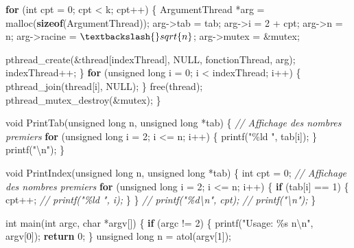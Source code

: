 \documentclass[
]{article}
\newenvironment{Shaded}{}{}
\newcommand{\CommentTok}[1]{\textcolor[rgb]{0.38,0.63,0.69}{\textit{#1}}}
\newcommand{\ControlFlowTok}[1]{\textcolor[rgb]{0.00,0.44,0.13}{\textbf{#1}}}
\newcommand{\DataTypeTok}[1]{\textcolor[rgb]{0.56,0.13,0.00}{#1}}
\newcommand{\DecValTok}[1]{\textcolor[rgb]{0.25,0.63,0.44}{#1}}
\newcommand{\KeywordTok}[1]{\textcolor[rgb]{0.00,0.44,0.13}{\textbf{#1}}}
\newcommand{\NormalTok}[1]{#1}
\newcommand{\SpecialCharTok}[1]{\textcolor[rgb]{0.25,0.44,0.63}{#1}}
\newcommand{\StringTok}[1]{\textcolor[rgb]{0.25,0.44,0.63}{#1}}
\begin{document}
\begin{Shaded}
\begin{Highlighting}[]
    \ControlFlowTok{for}\NormalTok{ (}\DataTypeTok{int}\NormalTok{ cpt = }\DecValTok{0}\NormalTok{; cpt \textless{} k; cpt++)}
\NormalTok{    \{}
\NormalTok{        ArgumentThread *arg = malloc(}\KeywordTok{sizeof}\NormalTok{(ArgumentThread));}
\NormalTok{        arg{-}\textgreater{}tab = tab;}
\NormalTok{        arg{-}\textgreater{}i = }\DecValTok{2}\NormalTok{ + cpt;}
\NormalTok{        arg{-}\textgreater{}n = n;}
\NormalTok{        arg{-}\textgreater{}racine = $\textbackslash{}sqrt\{n\}$;}
\NormalTok{        arg{-}\textgreater{}mutex = \&mutex;}
        
\NormalTok{        pthread\_create(\&thread[indexThread], NULL, fonctionThread, arg);}
\NormalTok{        indexThread++;}
\NormalTok{    \}}
    \ControlFlowTok{for}\NormalTok{ (}\DataTypeTok{unsigned} \DataTypeTok{long}\NormalTok{ i = }\DecValTok{0}\NormalTok{; i \textless{} indexThread; i++)}
\NormalTok{    \{}
\NormalTok{        pthread\_join(thread[i], NULL);}
\NormalTok{    \}}
\NormalTok{    free(thread);}
\NormalTok{    pthread\_mutex\_destroy(\&mutex);}
\NormalTok{\}}

\DataTypeTok{void}\NormalTok{ PrintTab(}\DataTypeTok{unsigned} \DataTypeTok{long}\NormalTok{ n, }\DataTypeTok{unsigned} \DataTypeTok{long}\NormalTok{ *tab)}
\NormalTok{\{}
    \CommentTok{// Affichage des nombres premiers}
    \ControlFlowTok{for}\NormalTok{ (}\DataTypeTok{unsigned} \DataTypeTok{long}\NormalTok{ i = }\DecValTok{2}\NormalTok{; i \textless{}= n; i++)}
\NormalTok{    \{}
\NormalTok{        printf(}\StringTok{"\%ld "}\NormalTok{, tab[i]);}
\NormalTok{    \}}
\NormalTok{    printf(}\StringTok{"}\SpecialCharTok{\textbackslash{}n}\StringTok{"}\NormalTok{);}
\NormalTok{\}}

\DataTypeTok{void}\NormalTok{ PrintIndex(}\DataTypeTok{unsigned} \DataTypeTok{long}\NormalTok{ n, }\DataTypeTok{unsigned} \DataTypeTok{long}\NormalTok{ *tab)}
\NormalTok{\{}
    \DataTypeTok{int}\NormalTok{ cpt = }\DecValTok{0}\NormalTok{;}
    \CommentTok{// Affichage des nombres premiers}
    \ControlFlowTok{for}\NormalTok{ (}\DataTypeTok{unsigned} \DataTypeTok{long}\NormalTok{ i = }\DecValTok{2}\NormalTok{; i \textless{}= n; i++)}
\NormalTok{    \{}
        \ControlFlowTok{if}\NormalTok{ (tab[i] == }\DecValTok{1}\NormalTok{)}
\NormalTok{        \{}
\NormalTok{            cpt++;}
            \CommentTok{// printf("\%ld ", i);}
\NormalTok{        \}}
\NormalTok{    \}}
    \CommentTok{// printf("\%d\textbackslash{}n", cpt);}
    \CommentTok{// printf("\textbackslash{}n");}
\NormalTok{\}}

\DataTypeTok{int}\NormalTok{ main(}\DataTypeTok{int}\NormalTok{ argc, }\DataTypeTok{char}\NormalTok{ *argv[])}
\NormalTok{\{}
    \ControlFlowTok{if}\NormalTok{ (argc != }\DecValTok{2}\NormalTok{)}
\NormalTok{    \{}
\NormalTok{        printf(}\StringTok{"Usage: \%s n}\SpecialCharTok{\textbackslash{}n}\StringTok{"}\NormalTok{, argv[}\DecValTok{0}\NormalTok{]);}
        \ControlFlowTok{return} \DecValTok{0}\NormalTok{;}
\NormalTok{    \}}
    \DataTypeTok{unsigned} \DataTypeTok{long}\NormalTok{ n = atol(argv[}\DecValTok{1}\NormalTok{]);}


\end{Highlighting}
\end{Shaded}
\end{document}
